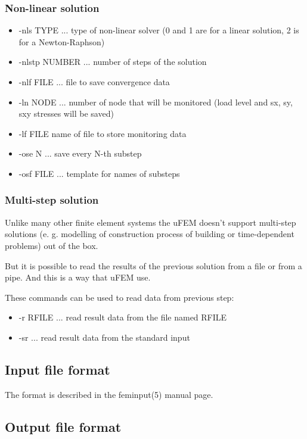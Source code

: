 \documentclass{article}
\begin{document}
\subsubsection{Non-linear solution}
\begin{itemize}
\item  -nls TYPE ... type of non-linear solver (0 and 1 are for a linear solution, 2 is for a Newton-Raphson)
\item  -nlstp NUMBER ... number of steps of the solution
\item  -nlf FILE ... file to save convergence data
\item  -ln NODE ... number of node that will be monitored (load level and sx, sy, sxy stresses will be saved)
\item  -lf FILE name of file to store monitoring data
\item  -ose N ... save every N-th substep
\item  -osf FILE ... template for names of substeps
\end{itemize}

\subsubsection{Multi-step solution}

 Unlike many other finite element systems the uFEM doesn't
 support multi-step solutions (e. g. modelling of construction
 process of building or time-dependent problems) out of the box.
 
 But it is possible to read the results of the previous solution
 from a file or from a pipe. And this is a way that uFEM use.
 
 These commands can be used to read data from previous step:


\begin{itemize}
\item  -r RFILE ... read result data from the file named RFILE
\item  -sr ... read result data from the standard input
\end{itemize}

\subsection{Input file format}

 The format is described in the feminput(5) manual page.



\subsection{Output file format}
\end{document}
